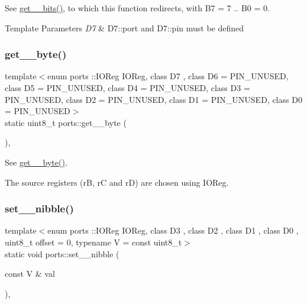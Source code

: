 See \hyperlink{namespaceports_a9a1959ec95780c00a964b174a27b2a37}{get\+\_\+\_\+bits()}, to which this function redirects, with {\ttfamily B7 = 7} .. {\ttfamily B0 = 0}. 


\begin{DoxyTemplParams}{Template Parameters}
{\em D7} & {\ttfamily D7\+::port} and {\ttfamily D7\+::pin} must be defined \\
\hline
\end{DoxyTemplParams}
\hypertarget{namespaceports_abcf67102d107c0aaad21fbb9f15563ae}{}\label{namespaceports_abcf67102d107c0aaad21fbb9f15563ae} 
\subsubsection{\texorpdfstring{get\+\_\+\_\+byte()}{get\_8\_byte()}\hspace{0.1cm}{\footnotesize\ttfamily [2/2]}}
{\footnotesize\ttfamily template$<$enum ports \+::\+I\+O\+Reg I\+O\+Reg, class D7 , class D6  = P\+I\+N\+\_\+\+U\+N\+U\+S\+ED, class D5  = P\+I\+N\+\_\+\+U\+N\+U\+S\+ED, class D4  = P\+I\+N\+\_\+\+U\+N\+U\+S\+ED, class D3  = P\+I\+N\+\_\+\+U\+N\+U\+S\+ED, class D2  = P\+I\+N\+\_\+\+U\+N\+U\+S\+ED, class D1  = P\+I\+N\+\_\+\+U\+N\+U\+S\+ED, class D0  = P\+I\+N\+\_\+\+U\+N\+U\+S\+ED$>$ \\
static uint8\+\_\+t ports\+::get\+\_\+\_\+byte (\begin{DoxyParamCaption}{ }\end{DoxyParamCaption})\hspace{0.3cm}{\ttfamily [inline]}, {\ttfamily [static]}}



See \hyperlink{namespaceports_ae7d1ffc9ed6454ca61b006ffe43e4e6e}{get\+\_\+\_\+byte()}. 

The source registers ({\ttfamily rB}, {\ttfamily rC} and {\ttfamily rD}) are chosen using I\+O\+Reg. \hypertarget{namespaceports_af6d35bb70c3973212025200a2af3ac5c}{}\label{namespaceports_af6d35bb70c3973212025200a2af3ac5c} 
\subsubsection{\texorpdfstring{set\+\_\+\_\+nibble()}{set\_4\_nibble()}}
{\footnotesize\ttfamily template$<$enum ports \+::\+I\+O\+Reg I\+O\+Reg, class D3 , class D2 , class D1 , class D0 , uint8\+\_\+t offset = 0, typename V  = const uint8\+\_\+t$>$ \\
static void ports\+::set\+\_\+\_\+nibble (\begin{DoxyParamCaption}\item[{const V \&}]{val }\end{DoxyParamCaption})\hspace{0.3cm}{\ttfamily [inline]}, {\ttfamily [static]}}



